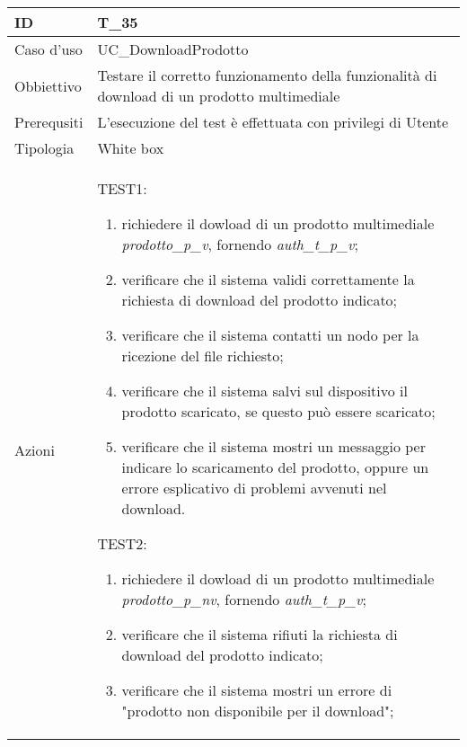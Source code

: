 \begin{table}[hb]
    \centering
    \begin{tabular}{ |p{2cm}|p{10cm}|  }
        \hline
        ID          & T\_35                                                                                        \\\hline
        Caso d'uso  & UC\_DownloadProdotto                                                                         \\\hline
        Obbiettivo  & Testare il corretto funzionamento della funzionalità di download di un prodotto multimediale \\\hline
        Prerequsiti & L'esecuzione del test è effettuata con privilegi di Utente                                   \\\hline
        Tipologia   & White box                                                                                    \\\hline
        Azioni      &
        TEST1:
        \begin{enumerate}[nosep, topsep=0pt]
            \item richiedere il dowload di un prodotto multimediale \emph{prodotto\_p\_v}, fornendo \emph{auth\_t\_p\_v};
            \item verificare che il sistema validi correttamente la richiesta di download del prodotto indicato;
            \item verificare che il sistema contatti un nodo per la ricezione del file richiesto;
            \item verificare che il sistema salvi sul dispositivo il prodotto scaricato, se questo può essere scaricato;
            \item verificare che il sistema mostri un messaggio per indicare lo scaricamento del prodotto, oppure un errore esplicativo di problemi avvenuti nel download.
        \end{enumerate}
        \vspace{0.5cm} TEST2:
        \begin{enumerate}[nosep, topsep=0pt]
            \item richiedere il dowload di un prodotto multimediale \emph{prodotto\_p\_nv}, fornendo \emph{auth\_t\_p\_v};
            \item verificare che il sistema rifiuti la richiesta di download del prodotto indicato;
            \item verificare che il sistema mostri un errore di "prodotto non disponibile per il download";
        \end{enumerate}
        \\\hline
    \end{tabular}
\end{table}

